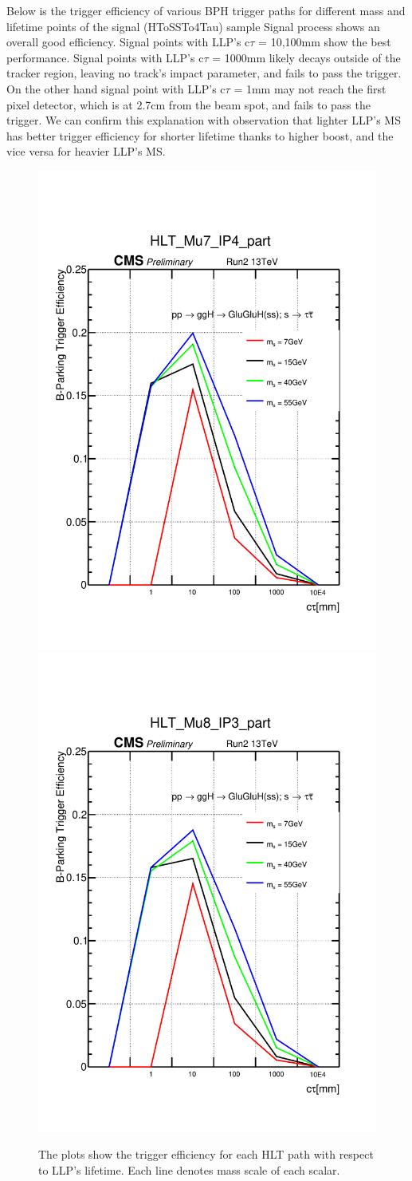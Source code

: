 Below is the trigger efficiency of various BPH trigger paths for different mass and lifetime points of the signal (HToSSTo4Tau) sample
Signal process shows an overall good efficiency.
Signal points with LLP's c$\tau$ = 10,100mm show the best performance.
Signal points with LLP's c$\tau$ = 1000mm likely decays outside of the tracker region, leaving no track's impact parameter, and fails to pass the trigger.
On the other hand signal point with LLP's c$\tau$ = 1mm may not reach the first pixel detector, which is at 2.7cm from the beam spot, and fails to pass the trigger.
We can confirm this explanation with observation that lighter LLP's MS has better trigger efficiency for shorter lifetime thanks to higher boost, and the vice versa for heavier LLP's MS. 
\begin{figure}[h!]
  \caption{The plots show the trigger efficiency for each HLT path with respect to LLP's lifetime. Each line denotes mass scale of each scalar.}
  \label{fig:Trigger Efficiency}
  \centering
  \includegraphics[width=0.47\linewidth]{figs/TrigEff_HLT_Mu7_IP4_part.pdf}
  \includegraphics[width=0.47\linewidth]{figs/TrigEff_HLT_Mu8_IP3_part.pdf}

\end{figure}
